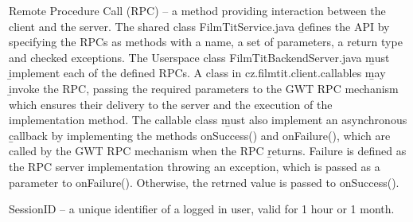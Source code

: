 
Remote Procedure Call (RPC) -- a method providing interaction between the client and the server. The shared class FilmTitService.java \b{defines} the API by specifying the RPCs as methods with a name, a set of parameters, a return type and checked exceptions. The Userspace class FilmTitBackendServer.java \b{must} \b{implement} each of the defined RPCs. A class in cz.filmtit.client.callables \b{may} \b{invoke} the RPC, passing the required parameters to the GWT RPC mechanism which ensures their delivery to the server and the execution of the implementation method. The callable class \b{must} also implement an asynchronous \b{callback} by implementing the methods onSuccess() and onFailure(), which are called by the GWT RPC mechanism when the RPC \b{returns}. Failure is defined as the RPC server implementation throwing an exception, which is passed as a parameter to onFailure(). Otherwise, the retrned value is passed to onSuccess().

SessionID -- a unique identifier of a logged in user, valid for 1 hour or 1 month.

